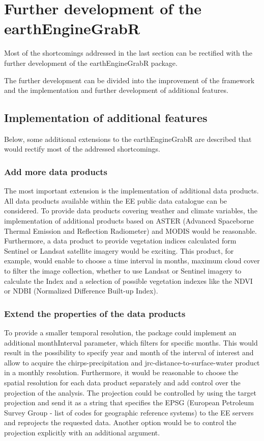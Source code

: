 \section{Further development of the earthEngineGrabR}

Most of the shortcomings addressed in the last section can be rectified with the further development of the earthEngineGrabR package. 

The further development can be divided into the improvement of the framework and the implementation and further development of additional features.

\subsection{Implementation of additional features}

Below, some additional extensions to the earthEngineGrabR are described that would rectify most of the addressed shortcomings.

\subsubsection{Add more data products}

The most important extension is the implementation of additional data products. All data products available within the EE public data catalogue can be considered. To provide data products covering weather and climate variables, the implementation of additional products based on ASTER (Advanced Spaceborne Thermal Emission and Reflection Radiometer) and MODIS would be reasonable. Furthermore, a data product to provide vegetation indices calculated form Sentinel or Landsat satellite imagery would be exciting. This product, for example, would enable to choose a time interval in months, maximum cloud cover to filter the image collection, whether to use Landsat or Sentinel imagery to calculate the Index and a selection of possible vegetation indexes like the NDVI or NDBI (Normalized Difference Built-up Index). 

\subsubsection{Extend the properties of the data products}
To provide a smaller temporal resolution, the package could implement an additional monthInterval parameter, which filters for specific months. This would result in the possibility to specify year and month of the interval of interest and allow to acquire the chirps-precipitation and jrc-distance-to-surface-water product in a monthly resolution.
Furthermore, it would be reasonable to choose the spatial resolution for each data product separately and add control over the projection of the analysis. 
The projection could be controlled by using the target projection and send it as a string that specifies the EPSG (European Petroleum Survey Group - list of codes for geographic reference systems) to the EE servers and reprojects the requested data. Another option would be to control the projection explicitly with an additional argument.


